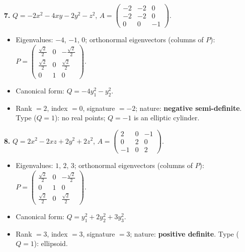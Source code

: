 \noindent\textbf{7.} $Q=- 2 x^{2} - 4 x y - 2 y^{2} - z^{2}$, $A=\begin{pmatrix}-2 & -2 & 0 \\ -2 & -2 & 0 \\ 0 & 0 & -1\end{pmatrix}$.
\begin{itemize}\item Eigenvalues: $-4$, $-1$, $0$; orthonormal eigenvectors (columns of $P$): $P=\begin{pmatrix}\frac{\sqrt{2}}{2} & 0 & - \frac{\sqrt{2}}{2} \\ \frac{\sqrt{2}}{2} & 0 & \frac{\sqrt{2}}{2} \\ 0 & 1 & 0\end{pmatrix}$.
\item Canonical form: $Q=- 4 y_{1}^{2} - y_{2}^{2}$.
\item Rank $=2$, index $=0$, signature $=-2$; nature: \textbf{negative semi-definite}. Type ($Q=1$): no real points; $Q=-1$ is an elliptic cylinder.\end{itemize}

\noindent\textbf{8.} $Q=2 x^{2} - 2 x z + 2 y^{2} + 2 z^{2}$, $A=\begin{pmatrix}2 & 0 & -1 \\ 0 & 2 & 0 \\ -1 & 0 & 2\end{pmatrix}$.
\begin{itemize}\item Eigenvalues: $1$, $2$, $3$; orthonormal eigenvectors (columns of $P$): $P=\begin{pmatrix}\frac{\sqrt{2}}{2} & 0 & - \frac{\sqrt{2}}{2} \\ 0 & 1 & 0 \\ \frac{\sqrt{2}}{2} & 0 & \frac{\sqrt{2}}{2}\end{pmatrix}$.
\item Canonical form: $Q=y_{1}^{2} + 2 y_{2}^{2} + 3 y_{3}^{2}$.
\item Rank $=3$, index $=3$, signature $=3$; nature: \textbf{positive definite}. Type ($Q=1$): ellipsoid.\end{itemize}

